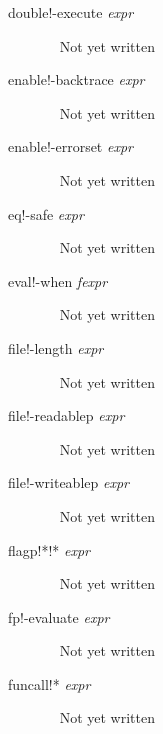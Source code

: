 \documentclass[a4paper,11pt]{article}
\begin{document}
\begin{description}
\item [{\ttfamily double!-execute} {\itshape  expr}]  ~\newline
Not yet written

\item [{\ttfamily enable!-backtrace} {\itshape  expr}]  ~\newline
Not yet written

\item [{\ttfamily enable!-errorset} {\itshape  expr}]  ~\newline
Not yet written

\item [{\ttfamily eq!-safe} {\itshape  expr}]  ~\newline
Not yet written

\item [{\ttfamily eval!-when} {\itshape  fexpr}]  ~\newline
Not yet written

\item [{\ttfamily file!-length} {\itshape  expr}]  ~\newline
Not yet written

\item [{\ttfamily file!-readablep} {\itshape  expr}]  ~\newline
Not yet written

\item [{\ttfamily file!-writeablep} {\itshape  expr}]  ~\newline
Not yet written

\item [{\ttfamily flagp!*!*} {\itshape  expr}]  ~\newline
Not yet written

\item [{\ttfamily fp!-evaluate} {\itshape  expr}]  ~\newline
Not yet written

\item [{\ttfamily funcall!*} {\itshape  expr}]  ~\newline
Not yet written


\end{description}
\end{document}
